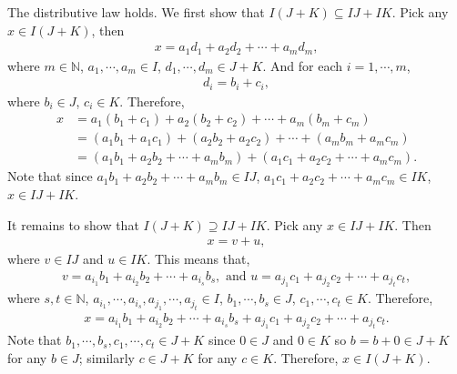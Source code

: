 \documentclass[12pt]{article}
\begin{document}
\begin{fproof}[Jacobson 2.5.3]
    The distributive law holds.
    We first show that \(I(J + K) \subseteq IJ + IK\).
    Pick any \(x \in I(J+K)\),
    then
    \begin{align*}
        x = a_1d_1 + a_2d_2 + \cdots + a_md_m,
    \end{align*}
    where \(m \in \mathbb{N}\), \(a_1, \cdots, a_m \in I\), \(d_1, \cdots, d_m \in J+K\).
    And for each \(i = 1, \cdots, m\),
    \begin{align*}
        d_i = b_i + c_i,
    \end{align*}
    where \(b_i \in J\), \(c_i \in K\).
    Therefore,
    \begin{align*}
        x &= a_1(b_1 + c_1) + a_2(b_2 + c_2) + \cdots + a_m(b_m + c_m)\\
        &=(a_1b_1 + a_1c_1) + (a_2b_2 + a_2c_2) + \cdots + (a_mb_m + a_mc_m)\\
        &=(a_1b_1 + a_2b_2 + \cdots + a_mb_m) + (a_1c_1 + a_2c_2 + \cdots + a_mc_m).
    \end{align*}
    Note that since \(a_1b_1 + a_2b_2 + \cdots + a_mb_m \in IJ\), \(a_1c_1 + a_2c_2 + \cdots + a_mc_m \in IK\), \(x \in IJ + IK\).

    It remains to show that \(I(J+K) \supseteq IJ + IK\).
    Pick any \(x \in IJ + IK\).
    Then
    \begin{align*}
        x = v + u,
    \end{align*}
    where \(v \in IJ\) and \(u \in IK\).
    This means that,
    \begin{align*}
        v = a_{i_1}b_1 + a_{i_2}b_2 + \cdots + a_{i_s}b_s, \text{ and } u = a_{j_1}c_1 + a_{j_2}c_2 + \cdots + a_{j_t}c_t,
    \end{align*}
    where \(s,t \in \mathbb{N}\), \(a_{i_1}, \cdots, a_{i_s}, a_{j_1}, \cdots, a_{j_t} \in I\), \(b_1, \cdots, b_s \in J\), \(c_1, \cdots, c_t \in K\).
    Therefore,
    \begin{align*}
        x = a_{i_1}b_1 + a_{i_2}b_2 + \cdots + a_{i_s}b_s + a_{j_1}c_1 + a_{j_2}c_2 + \cdots + a_{j_t}c_t.
    \end{align*}
    Note that \(b_1, \cdots, b_s, c_1, \cdots, c_t \in J + K\) since \(0 \in J\) and \(0 \in K\) so \(b = b + 0 \in J+K\) for any \(b \in J\); similarly \(c \in J+K\) for any \(c \in K\).
    Therefore, \(x \in I(J+K)\).
\end{fproof}
\newpage

\begin{fproof}[Jacobson 2.6.4]

\end{fproof}
\newpage
\end{document}
